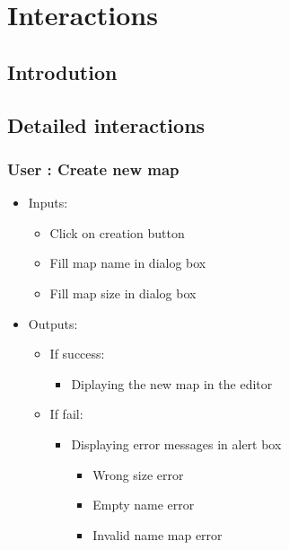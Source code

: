 \newpage
\thispagestyle{empty}
\chapter{Interactions}

\section{Introdution}

\section{Detailed interactions}
\subsection{User : Create new map}
	\begin{itemize}
		\item Inputs:
			\begin{itemize}
				\item Click on creation button
				\item Fill map name in dialog box
				\item Fill map size in dialog box
			\end{itemize}
			\item Outputs:
				\begin{itemize}
					\item If success:					
					\begin{itemize}
						\item Diplaying the new map in the editor
					\end{itemize}
					\item If fail:
					\begin{itemize}
					\item Displaying error messages in alert box
					\begin{itemize}
						\item Wrong size error
						\item Empty name error
						\item Invalid name map error
					\end{itemize}
					\end{itemize}
				\end{itemize}
	\end{itemize}